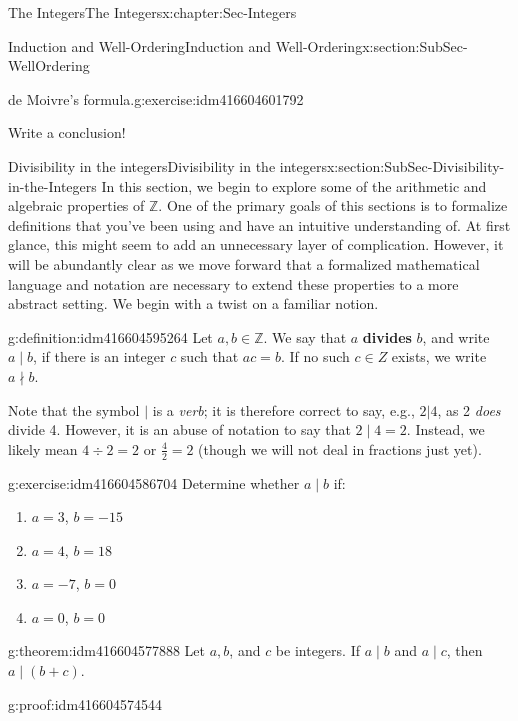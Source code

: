 \documentclass[oneside,10pt,]{book}
\newcommand{\terminology}[1]{\textbf{#1}}
\numberwithin{equation}{section}
\def\Z{{\mathbb Z}}
\begin{document}
\begin{chapterptx}{The Integers}{}{The Integers}{}{}{x:chapter:Sec-Integers}
\begin{sectionptx}{Induction and Well-Ordering}{}{Induction and Well-Ordering}{}{}{x:section:SubSec-WellOrdering}
\begin{inlineexercise}{de Moivre's formula.}{g:exercise:idm416604601792}
\end{inlineexercise}
\begin{conclusion}{}%
Write a conclusion!\end{conclusion}%
\end{sectionptx}
%
%
\typeout{************************************************}
\typeout{************************************************}
%
\begin{sectionptx}{Divisibility in the integers}{}{Divisibility in the integers}{}{}{x:section:SubSec-Divisibility-in-the-Integers}
In this section, we begin to explore some of the arithmetic and algebraic properties of \(\Z\). One of the primary goals of this sections is to formalize definitions that you've been using and have an intuitive understanding of. At first glance, this might seem to add an unnecessary layer of complication. However, it will be abundantly clear as we move forward that a formalized mathematical language and notation are necessary to extend these properties to a more abstract setting. We begin with a twist on a familiar notion.%
\begin{definition}{}{g:definition:idm416604595264}%
Let \(a,b\in \Z\). We say that \(a\) \terminology{divides} \(b\), and write \(a\mid b\), if there is an integer \(c\) such that \(ac = b\). If no such \(c\in Z\) exists, we write \(a\nmid b\).%
\end{definition}
Note that the symbol \(|\) is a \emph{verb}; it is therefore correct to say, e.g., \(2|4\), as 2 \emph{does} divide 4. However, it is an abuse of notation to say that \(2\mid 4 = 2\). Instead, we likely mean \(4\div 2 = 2\) or \(\frac{4}{2} = 2\) (though we will not deal in fractions just yet).%
\begin{inlineexercise}{}{g:exercise:idm416604586704}%
Determine whether \(a\mid b\) if:%
\begin{enumerate}
\item{}\(a = 3\), \(b = -15\)%
\item{}\(a = 4\), \(b = 18\)%
\item{}\(a = -7\), \(b = 0\)%
\item{}\(a = 0\), \(b = 0\)%
\end{enumerate}
%
\end{inlineexercise}
\begin{theorem}{}{}{g:theorem:idm416604577888}%
Let \(a,b\), and \(c\) be integers. If \(a\mid b\) and \(a\mid c\), then \(a\mid (b+c)\).%
\end{theorem}
\begin{proofptx}{}{g:proof:idm416604574544}

\end{proofptx}
\end{sectionptx}
\end{chapterptx}
\end{document}
